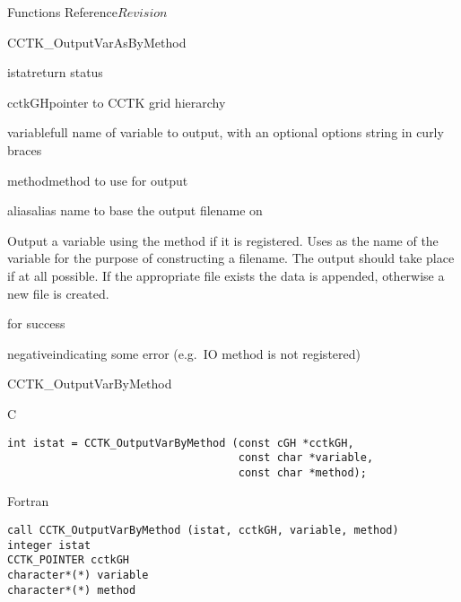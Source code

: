 \begin{cactuspart}{ Functions Reference}{}{$Revision$}
\begin{FunctionDescription}{CCTK\_OutputVarAsByMethod}
\begin{ParameterSection}
\begin{Parameter}{istat}return status\end{Parameter}
\begin{Parameter}{cctkGH}pointer to CCTK grid hierarchy\end{Parameter}
\begin{Parameter}{variable}full name of variable to output, with an optional
options string in curly braces\end{Parameter}
\begin{Parameter}{method}method to use for output\end{Parameter}
\begin{Parameter}{alias}alias name to base the output filename on\end{Parameter}
\end{ParameterSection}

\begin{Discussion}
Output a variable  using the method  if it is
registered. Uses  as the name of the variable for the purpose
of constructing a filename. The output should take place if at all possible.
If the appropriate file exists the data is appended, otherwise a new
file is created.
\end{Discussion}

\begin{ErrorSection}
\begin{Error}{0}for success\end{Error}
\begin{Error}{negative}indicating some error (e.g.\ IO method is not registered)\end{Error}
\end{ErrorSection}
\end{FunctionDescription}


\begin{FunctionDescription}{CCTK\_OutputVarByMethod}
\label{CCTK-OutputVarByMethod}
\begin{SynopsisSection}
\begin{Synopsis}{C}
\begin{verbatim}
int istat = CCTK_OutputVarByMethod (const cGH *cctkGH,
                                    const char *variable,
                                    const char *method);
\end{verbatim}
\end{Synopsis}
\begin{Synopsis}{Fortran}
\begin{verbatim}
call CCTK_OutputVarByMethod (istat, cctkGH, variable, method)
integer istat
CCTK_POINTER cctkGH
character*(*) variable
character*(*) method
\end{verbatim}
\end{Synopsis}
\end{SynopsisSection}


\end{FunctionDescription}
\end{cactuspart}
